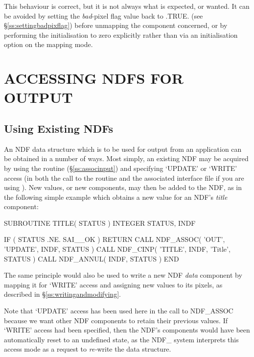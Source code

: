 \documentclass[twoside,11pt,nolof]{starlink}
\providecommand{\st}[1]{{\emph{#1}}}
\begin{document}
This behaviour is correct, but it is not always what is expected, or wanted.
It can be avoided by setting the \st{bad}-pixel flag value back to
.TRUE. (see \S\ref{ss:settingbadpixflag}) before unmapping the
component concerned,
or by performing the initialisation to zero explicitly rather than via an
initialisation option on the mapping mode.


\section{ACCESSING NDFS FOR OUTPUT}

\subsection{Using Existing NDFs}

An NDF data structure which is to be used for output from an application can
be obtained in a number of ways.
Most simply, an existing NDF may be acquired by using the  routine
(\S\ref{ss:associnput}) and specifying `UPDATE' or `WRITE' access (in both the
call to the routine and the associated interface file if you are using
).
New values, or new components, may then be added to the NDF, as in the
following simple example which obtains a new value for an NDF's \st{title\/}
component:

\small
\begin{terminalv}
      SUBROUTINE TITLE( STATUS )
      INTEGER STATUS, INDF

      IF ( STATUS .NE. SAI__OK ) RETURN
      CALL NDF_ASSOC( 'OUT', 'UPDATE', INDF, STATUS )
      CALL NDF_CINP( 'TITLE', INDF, 'Title', STATUS )
      CALL NDF_ANNUL( INDF, STATUS )
      END
\end{terminalv}
\normalsize

The same principle would also be used to write a new NDF \st{data\/}
component by mapping it for `WRITE' access and assigning new values to its
pixels, as described in \S\ref{ss:writingandmodifying}.

Note that `UPDATE' access has been used here in the call to NDF\_ASSOC
because we want other NDF components to retain their previous values.
If `WRITE' access had been specified, then the NDF's components would have
been automatically reset to an undefined state, as the NDF\_ system
interprets this access mode as a request to \st{re-\/}write the data
structure.
\end{document}
